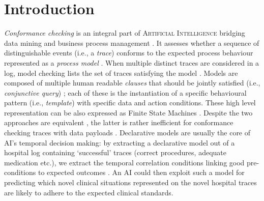 \section{Introduction}

\textit{Conformance checking} is an integral part of \textsc{Artificial Intelligence} {bridging} data mining and business process management \cite{bpm21}. It assesses whether a sequence of distinguishable events (i.e., a \textit{trace}) conforms to the expected process behaviour represented as a \textit{process model} \cite{RozinatA08}. When multiple distinct traces are considered in a log, model checking lists the set of traces satisfying the model \cite{BurattinMS16}. Models are composed of multiple human readable \textit{clauses} that should be  jointly satisfied (i.e., \textit{conjunctive query}) \cite{Li2020}; each of these is the instantiation of a specific behavioural pattern (i.e., \textit{template}) with specific data and action conditions. These high level representation can be also expressed as Finite State Machines \cite{MultiPerspective}. %
{Despite the two approaches are equivalent}  \cite{AgostinelliBFMM21}, {the latter is rather inefficient for conformance checking traces with data payloads} \cite{bpm21}. %
{Declarative models are usually   the core} of AI's temporal decision making: by extracting a declarative model out of a hospital log \cite{mining} containing `successful' traces (correct procedures, adequate medication etc.), we extract the temporal correlation conditions linking good pre-conditions to expected outcomes  \cite{Amantea2020}. An AI could then exploit such a model
for predicting which novel clinical situations represented on the novel hospital traces are likely to adhere to the expected clinical standards.

